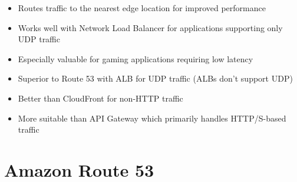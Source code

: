 \documentclass[11pt,a4paper]{report}
\begin{document}
\begin{itemize}
\begin{itemize}
  \item Routes traffic to the nearest edge location for improved performance
  \item Works well with Network Load Balancer for applications supporting only UDP traffic
  \item Especially valuable for gaming applications requiring low latency
  \item Superior to Route 53 with ALB for UDP traffic (ALBs don't support UDP)
  \item Better than CloudFront for non-HTTP traffic
  \item More suitable than API Gateway which primarily handles HTTP/S-based traffic
\end{itemize}
\end{itemize}


\section{Amazon Route 53}
\end{document}

